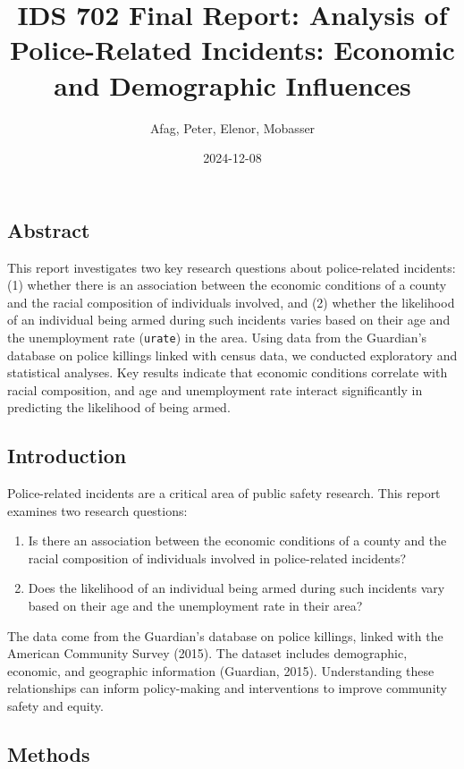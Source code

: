 \documentclass[
  letterpaper,
  DIV=11,
  numbers=noendperiod]{scrartcl}
\title{IDS 702 Final Report: Analysis of Police-Related Incidents:
Economic and Demographic Influences}
\author{Afag, Peter, Elenor, Mobasser}
\date{2024-12-08}
\providecommand{\tightlist}{%
  \setlength{\itemsep}{0pt}\setlength{\parskip}{0pt}}\usepackage{longtable,booktabs,array}
\begin{document}
\maketitle


\subsection{Abstract}\label{abstract}

This report investigates two key research questions about police-related
incidents: (1) whether there is an association between the economic
conditions of a county and the racial composition of individuals
involved, and (2) whether the likelihood of an individual being armed
during such incidents varies based on their age and the unemployment
rate (\texttt{urate}) in the area. Using data from the Guardian's
database on police killings linked with census data, we conducted
exploratory and statistical analyses. Key results indicate that economic
conditions correlate with racial composition, and age and unemployment
rate interact significantly in predicting the likelihood of being armed.

\subsection{Introduction}\label{introduction}

Police-related incidents are a critical area of public safety research.
This report examines two research questions:

\begin{enumerate}
\def\labelenumi{\arabic{enumi}.}
\tightlist
\item
  Is there an association between the economic conditions of a county
  and the racial composition of individuals involved in police-related
  incidents?
\item
  Does the likelihood of an individual being armed during such incidents
  vary based on their age and the unemployment rate in their area?
\end{enumerate}

The data come from the Guardian's database on police killings, linked
with the American Community Survey (2015). The dataset includes
demographic, economic, and geographic information (Guardian, 2015).
Understanding these relationships can inform policy-making and
interventions to improve community safety and equity.

\subsection{Methods}\label{methods}
\end{document}

